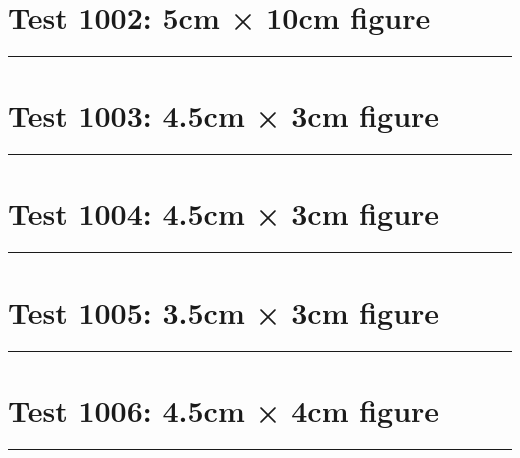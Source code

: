 \documentclass[a4paper,11pt]{article}
\begin{document}
\section*{Test 1002: 5cm × 10cm figure}
\begin{swarmwrap}%
  \begin{minipage}[t]{5cm}
    \centering
    \rule{\linewidth}{10cm}
  \end{minipage}%
\end{swarmwrap}%
\swarmwrapnext
\lipsum[14]
\lipsum[15]
\lipsum[16]
\section*{Test 1003: 4.5cm × 3cm figure}
\begin{swarmwrap}%
  \begin{minipage}[t]{4cm}
    \centering
    \rule{\linewidth}{3cm}
  \end{minipage}%
\end{swarmwrap}%
\swarmwrapnext
\lipsum[14]
\lipsum[15]
\lipsum[16]
\section*{Test 1004: 4.5cm × 3cm figure}
\begin{swarmwrap}%
  \begin{minipage}[t]{4cm}
    \centering
    \rule{\linewidth}{3cm}
  \end{minipage}%
\end{swarmwrap}%
\swarmwrapnext
\lipsum[115]
\lipsum[116]
\lipsum[117]
\lipsum[118]
\lipsum[119]
\lipsum[120]
\section*{Test 1005: 3.5cm × 3cm figure}
\begin{swarmwrap}%
  \begin{minipage}[t]{3cm}
    \centering
    \rule{\linewidth}{3cm}
  \end{minipage}%
\end{swarmwrap}%
\swarmwrapnext
\lipsum[123]
\lipsum[124]
\lipsum[125]
\lipsum[126]
\lipsum[127]
\section*{Test 1006: 4.5cm × 4cm figure}
\begin{swarmwrap}%
  \begin{minipage}[t]{4cm}
    \centering
    \rule{\linewidth}{4cm}
  \end{minipage}%
\end{swarmwrap}%
\swarmwrapnext
\lipsum[4]
\lipsum[5]
\lipsum[6]
\lipsum[7]
\end{document}
